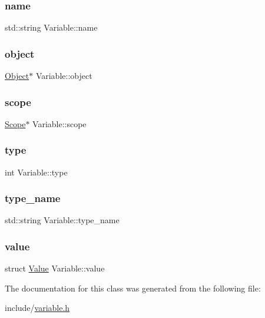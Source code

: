 \subsubsection{\texorpdfstring{name}{name}}
{\footnotesize\ttfamily std\+::string Variable\+::name}

\mbox{\label{classVariable_aea57391bcc48e74c9d8cae131612ff0b}} 
\subsubsection{\texorpdfstring{object}{object}}
{\footnotesize\ttfamily \hyperlink{classObject}{Object}$\ast$ Variable\+::object}

\mbox{\label{classVariable_a1d7f7a674747e42e4ecc5267252c12d4}} 
\subsubsection{\texorpdfstring{scope}{scope}}
{\footnotesize\ttfamily \hyperlink{classScope}{Scope}$\ast$ Variable\+::scope}

\mbox{\label{classVariable_a659e966bd442dbde52df805e15005bf9}} 
\subsubsection{\texorpdfstring{type}{type}}
{\footnotesize\ttfamily int Variable\+::type}

\mbox{\label{classVariable_ac237e4099c004a617ad8bd2effbfafb2}} 
\subsubsection{\texorpdfstring{type\+\_\+name}{type\_name}}
{\footnotesize\ttfamily std\+::string Variable\+::type\+\_\+name}

\mbox{\label{classVariable_a94151da0f0a411749f84aaf65a9c7045}} 
\subsubsection{\texorpdfstring{value}{value}}
{\footnotesize\ttfamily struct \hyperlink{classValue}{Value} Variable\+::value}



The documentation for this class was generated from the following file\+:\begin{DoxyCompactItemize}
\item 
include/\hyperlink{variable_8h}{variable.\+h}\end{DoxyCompactItemize}
